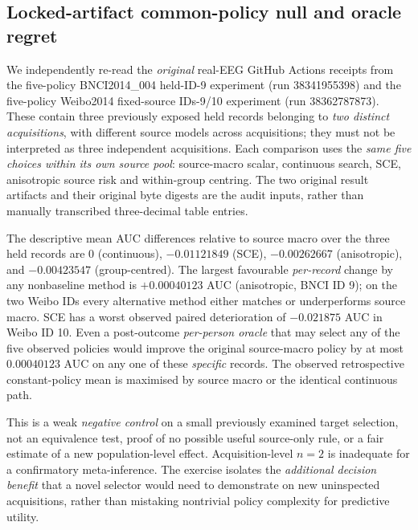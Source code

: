\subsection{Locked-artifact common-policy null and oracle regret}
\label{sec:p3-two-original-run-null}
We independently re-read the \emph{original} real-EEG
GitHub Actions receipts from the five-policy BNCI2014\_004
held-ID-9 experiment (run 38341955398) and the
five-policy Weibo2014 fixed-source IDs-9/10 experiment
(run 38362787873). These contain three previously
exposed held records belonging to \emph{two distinct
acquisitions}, with different source models across
acquisitions; they must not be interpreted as three
independent acquisitions. Each comparison uses the
\emph{same five choices within its own source pool}:
source-macro scalar, continuous search, SCE,
anisotropic source risk and within-group centring.
The two original result artifacts and their original
byte digests are the audit inputs, rather than
manually transcribed three-decimal table entries.

The descriptive mean AUC differences relative to
source macro over the three held records are
0 (continuous), $-0.01121849$ (SCE),
$-0.00262667$ (anisotropic), and
$-0.00423547$ (group-centred).
The largest favourable \emph{per-record} change
by any nonbaseline method is
$+0.00040123$ AUC (anisotropic, BNCI ID 9);
on the two Weibo IDs every alternative method
either matches or underperforms source macro.
SCE has a worst observed paired deterioration of
$-0.021875$ AUC in Weibo ID 10.
Even a post-outcome \emph{per-person oracle}
that may select any of the five observed policies
would improve the original source-macro policy
by at most $0.00040123$ AUC on any one of
these \emph{specific} records. The observed
retrospective constant-policy mean is maximised
by source macro or the identical continuous path.

This is a weak \emph{negative control} on a small
previously examined target selection, not an
equivalence test, proof of no possible useful
source-only rule, or a fair estimate of a new
population-level effect. Acquisition-level $n=2$
is inadequate for a confirmatory meta-inference.
The exercise isolates the \emph{additional decision
benefit} that a novel selector would need to
demonstrate on new uninspected acquisitions,
rather than mistaking nontrivial policy
complexity for predictive utility.
